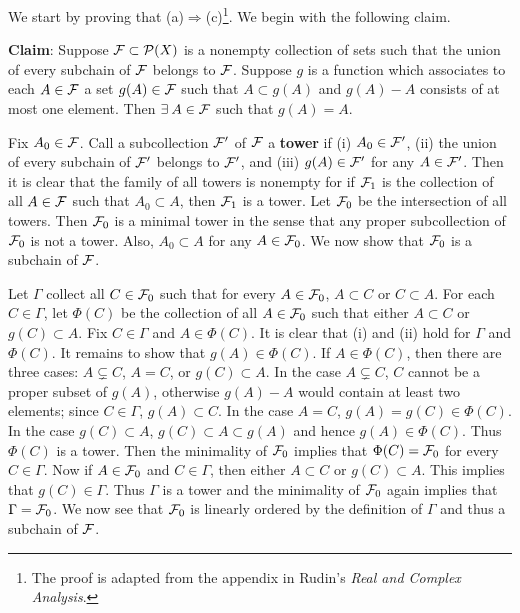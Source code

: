\begin{pf}
    We start by proving that (a)$\Rightarrow$(c)\footnote{The 
    proof is adapted from the appendix in Rudin's \textit{Real 
    and Complex Analysis}.}. We begin with the following 
    claim. 

    \textbf{Claim}: Suppose $\mathcal{F}\subset\mathcal{P}(X)$ is a 
    nonempty collection of sets such that the union of every 
    subchain of $\mathcal{F}$ belongs to $\mathcal{F}$. Suppose $g$ is a 
    function which associates to each $A\in\mathcal{F}$ a set 
    $g(A)\in\mathcal{F}$ such that $A\subset g(A)$ and $g(A)-A$ 
    consists of at most one element. Then $\exists\: A\in\mathcal{F}$ 
    such that $g(A)=A$.
    
    Fix $A_0\in\mathcal{F}$. Call a subcollection $\mathcal{F}'$ of $\mathcal{F}$ a 
    \textbf{tower} if (i) $A_0\in\mathcal{F}'$, (ii) the union of every 
    subchain of $\mathcal{F}'$ belongs to $\mathcal{F}'$, and (iii) $g(A)\in\mathcal{F}'$ 
    for any $A\in\mathcal{F}'$. Then it is clear that the family of all 
    towers is nonempty for if $\mathcal{F}_1$ is the collection of all 
    $A\in\mathcal{F}$ such that $A_0\subset A$, then $\mathcal{F}_1$ is a tower. 
    Let $\mathcal{F}_0$ be the intersection of all towers. Then $\mathcal{F}_0$ 
    is a minimal tower in the sense that any proper 
    subcollection of $\mathcal{F}_0$ is not a tower. Also, $A_0\subset 
    A$ for any $A\in\mathcal{F}_0$. We now show that $\mathcal{F}_0$ is a 
    subchain of $\mathcal{F}$. 

    Let $\Gamma$ collect all $C\in\mathcal{F}_0$ such that for every 
    $A\in\mathcal{F}_0$, $A\subset C$ or $C\subset A$. For each $C\in 
    \Gamma$, let $\Phi(C)$ be the collection of all $A\in\mathcal{F}_0$ 
    such that either $A\subset C$ or $g(C)\subset A$. Fix $C 
    \in\Gamma$ and $A\in\Phi(C)$. It is clear that (i) and (ii) 
    hold for $\Gamma$ and $\Phi(C)$. It remains to show that 
    $g(A)\in\Phi(C)$. If $A\in\Phi(C)$, then there are three 
    cases: $A\subsetneq C$, $A=C$, or $g(C)\subset A$. In the 
    case $A\subsetneq C$, $C$ cannot be a proper subset of 
    $g(A)$, otherwise $g(A)-A$ would contain at least two 
    elements; since $C\in\Gamma$, $g(A)\subset C$. In the case 
    $A=C$, $g(A)=g(C)\in\Phi(C)$. In the case $g(C)\subset A$, 
    $g(C)\subset A\subset g(A)$ and hence $g(A)\in\Phi(C)$. 
    Thus $\Phi(C)$ is a tower. Then the minimality of $\mathcal{F}_0$ 
    implies that $\Phi(C)=\mathcal{F}_0$ for every $C\in\Gamma$. Now if 
    $A\in\mathcal{F}_0$ and $C\in\Gamma$, then either $A\subset C$ or 
    $g(C)\subset A$. This implies that $g(C)\in\Gamma$. Thus 
    $\Gamma$ is a tower and the minimality of $\mathcal{F}_0$ again 
    implies that $\Gamma=\mathcal{F}_0$. We now see that $\mathcal{F}_0$ is 
    linearly ordered by the definition of $\Gamma$ and thus 
    a subchain of $\mathcal{F}$. 


\end{pf}
